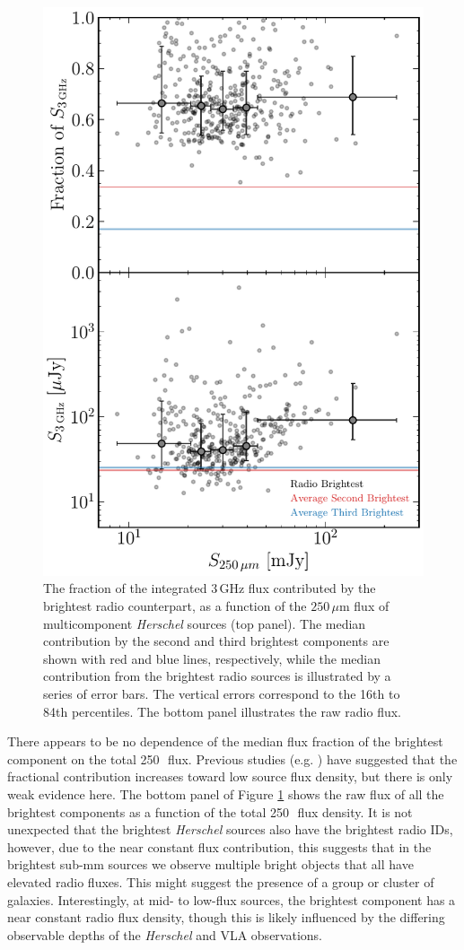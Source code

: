 \begin{figure}
	\centering
	\includegraphics[width=0.75\columnwidth]{Figures/multiples_flux_contribution.pdf}
	\caption[Contribution to radio flux from multicomponent radio sources]{The fraction of the integrated $3\,$GHz flux contributed by the brightest radio counterpart, as a function of the $250\,\mu$m flux of multicomponent \textit{Herschel} sources (top panel). The median contribution by the second and third brightest components are shown with red and blue lines, respectively, while the median contribution from the brightest radio sources is illustrated by a series of error bars. The vertical errors correspond to the 16th to 84th percentiles. The bottom panel illustrates the raw radio flux.}
	\label{fig:multiples_flux_contribution}
\end{figure}

There appears to be no dependence of the median flux fraction of the brightest component on the total 250\,\micron\ flux. Previous studies (e.g. \citealt{Scudder_2016}) have suggested that the fractional contribution increases toward low source flux density, but there is only weak evidence here. The bottom panel of Figure \ref{fig:multiples_flux_contribution} shows the raw flux of all the brightest components as a function of the total 250\,\micron\ flux density. It is not unexpected that the brightest \textit{Herschel} sources also have the brightest radio IDs, however, due to the near constant flux contribution, this suggests that in the brightest sub-mm sources we observe multiple bright objects that all have elevated radio fluxes. This might suggest the presence of a group or cluster of galaxies. Interestingly, at mid- to low-flux sources, the brightest component has a near constant radio flux density, though this is likely influenced by the differing observable depths of the \textit{Herschel} and VLA observations.

